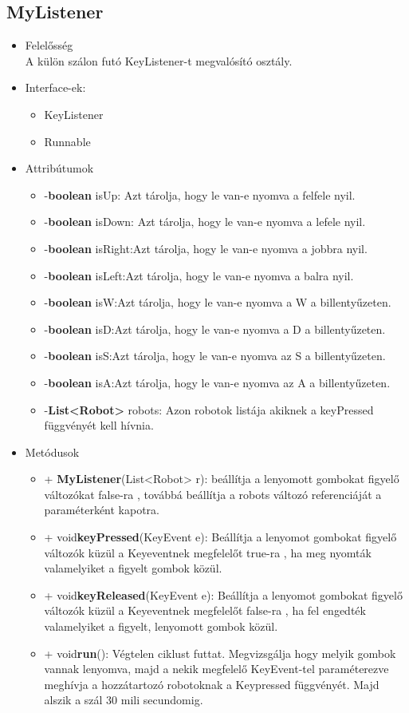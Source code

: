 \subsection{MyListener}
\begin{itemize}
\item Felelősség\\
A külön szálon futó KeyListener-t megvalósító osztály.
\item Interface-ek:
    \begin{itemize}
    \item KeyListener
    \item Runnable
    \end{itemize}
\item Attribútumok
	\begin{itemize}
		\item -\textbf{boolean} isUp: Azt tárolja, hogy le van-e nyomva a felfele nyil.
    	\item -\textbf{boolean} isDown: Azt tárolja, hogy le van-e nyomva a lefele nyil.
    	\item -\textbf{boolean} isRight:Azt tárolja, hogy le van-e nyomva a jobbra nyil.
    	\item -\textbf{boolean} isLeft:Azt tárolja, hogy le van-e nyomva a balra nyil.
    	\item -\textbf{boolean} isW:Azt tárolja, hogy le van-e nyomva a W a billentyűzeten.
    	\item -\textbf{boolean} isD:Azt tárolja, hogy le van-e nyomva a D a billentyűzeten.
    	\item -\textbf{boolean} isS:Azt tárolja, hogy le van-e nyomva az S a billentyűzeten.
    	\item -\textbf{boolean} isA:Azt tárolja, hogy le van-e nyomva az A a billentyűzeten.
   	\item -\textbf{List<Robot>} robots: Azon robotok listája akiknek a keyPressed függvényét kell hívnia.
	
	
	\end{itemize}
\item Metódusok
	\begin{itemize}
		\item+ \textbf{MyListener}(List<Robot> r): beállítja a lenyomott gombokat figyelő változókat false-ra , továbbá beállítja a robots változó referenciáját a paraméterként kapotra.
			\item+ void\textbf{keyPressed}(KeyEvent e): Beállítja a lenyomot gombokat figyelő változók küzül a Keyeventnek megfelelőt  true-ra , ha meg nyomták valamelyiket  a figyelt gombok közül.
			\item+ void\textbf{keyReleased}(KeyEvent e): Beállítja a lenyomot gombokat figyelő változók küzül a Keyeventnek megfelelőt false-ra , ha fel engedték valamelyiket a figyelt, lenyomott gombok közül.
				\item+ void\textbf{run}(): Végtelen ciklust futtat. Megvizsgálja hogy melyik gombok vannak lenyomva, majd a nekik megfelelő KeyEvent-tel paraméterezve meghívja a hozzátartozó robotoknak a Keypressed függvényét. Majd alszik a szál 30 mili secundomig.
	\end{itemize}
\end{itemize}

